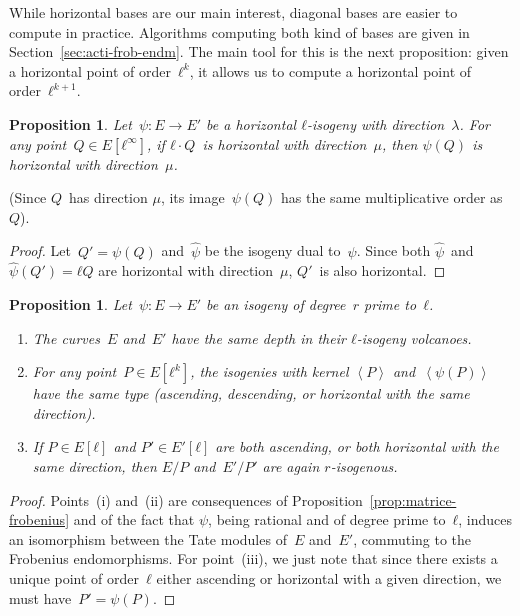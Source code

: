 \documentclass{lms}
\newtheorem{prop}[thm]{Proposition}
\def\chev#1{\left\langle#1\right\rangle}
\begin{document}
While horizontal bases are our main interest,
diagonal bases are easier to compute in practice.
Algorithms computing both kind of bases
are given in Section~\ref{sec:acti-frob-endm}.
The main tool for this is the next proposition:
given a horizontal point of order~$ℓ^k$,
it allows us to compute a horizontal point of order~$ℓ^{k+1}$.

\begin{prop}\label{prop:push-horizontal}
Let~$ψ: E → E'$ be a horizontal $ℓ$-isogeny with direction~$λ$.
For any point~$Q ∈ E[ℓ^∞]$,
if $ℓ · Q$~is horizontal with direction~$μ$,
then $ψ(Q)$ is horizontal with direction~$μ$.
\end{prop}
(Since $Q$~has direction $μ$,
its image~$ψ(Q)$ has the same multiplicative order as~$Q$).
\begin{proof}
Let~$Q' = ψ(Q)$ and~$\widehat{ψ}$ be the isogeny dual to~$ψ$.
Since both $\widehat{ψ}$~and~$\widehat{ψ}(Q') = ℓ Q$ are horizontal
with direction~$μ$, $Q'$~is also horizontal.
\end{proof}
\begin{prop}\label{prop:parallel}
Let~$ψ: E → E'$ be an isogeny of degree~$r$ prime to~$ℓ$.
\begin{enumerate}
\item The curves~$E$ and~$E'$ have the same depth
in their $ℓ$-isogeny volcanoes.
\item\label{prop:parallel:func} For any point~$P ∈ E[ℓ^k]$,
the isogenies with kernel $\chev{P}$ and~$\chev{ψ(P)}$ have the same type
(ascending, descending, or horizontal with the same direction).
\item\label{prop:parallel:ascent} If $P ∈ E[ℓ]$ and $P' ∈ E'[ℓ]$ are both ascending,
or both horizontal with the same direction,
then $E/P$ and~$E'/P'$ are again $r$-isogenous.
\end{enumerate}
\end{prop}
\begin{proof}
Points~(i) and~(ii) are consequences of Proposition~\ref{prop:matrice-frobenius}
and of the fact that $ψ$, being rational and of degree prime to~$ℓ$,
induces an isomorphism between the Tate modules of~$E$ and~$E'$,
commuting to the Frobenius endomorphisms.
For point~(iii), we just note that
since there exists a unique point of order~$ℓ$
either ascending or horizontal with a given direction,
we must have~$P' = ψ(P)$.
\end{proof}

\end{document}
